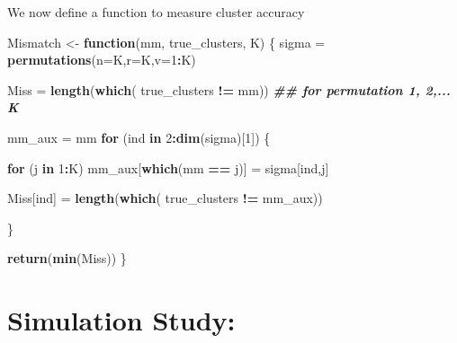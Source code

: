 \documentclass[
]{article}
\newenvironment{Shaded}{\begin{snugshade}}{\end{snugshade}}
\newcommand{\AttributeTok}[1]{\textcolor[rgb]{0.13,0.29,0.53}{#1}}
\newcommand{\ControlFlowTok}[1]{\textcolor[rgb]{0.13,0.29,0.53}{\textbf{#1}}}
\newcommand{\DecValTok}[1]{\textcolor[rgb]{0.00,0.00,0.81}{#1}}
\newcommand{\DocumentationTok}[1]{\textcolor[rgb]{0.56,0.35,0.01}{\textbf{\textit{#1}}}}
\newcommand{\FunctionTok}[1]{\textcolor[rgb]{0.13,0.29,0.53}{\textbf{#1}}}
\newcommand{\NormalTok}[1]{#1}
\newcommand{\OtherTok}[1]{\textcolor[rgb]{0.56,0.35,0.01}{#1}}
\newcommand{\SpecialCharTok}[1]{\textcolor[rgb]{0.81,0.36,0.00}{\textbf{#1}}}
\begin{document}
\begin{Shaded}
\end{Shaded}

We now define a function to measure cluster accuracy

\begin{Shaded}
\begin{Highlighting}[]
\NormalTok{Mismatch }\OtherTok{\textless{}{-}} \ControlFlowTok{function}\NormalTok{(mm, true\_clusters, K)}
\NormalTok{\{}
\NormalTok{  sigma }\OtherTok{=} \FunctionTok{permutations}\NormalTok{(}\AttributeTok{n=}\NormalTok{K,}\AttributeTok{r=}\NormalTok{K,}\AttributeTok{v=}\DecValTok{1}\SpecialCharTok{:}\NormalTok{K)}
  
\NormalTok{  Miss }\OtherTok{=} \FunctionTok{length}\NormalTok{(}\FunctionTok{which}\NormalTok{( true\_clusters }\SpecialCharTok{!=}\NormalTok{ mm))  }\DocumentationTok{\#\# for permutation 1, 2,... K}
  
\NormalTok{  mm\_aux }\OtherTok{=}\NormalTok{ mm}
  \ControlFlowTok{for}\NormalTok{ (ind }\ControlFlowTok{in} \DecValTok{2}\SpecialCharTok{:}\FunctionTok{dim}\NormalTok{(sigma)[}\DecValTok{1}\NormalTok{])}
\NormalTok{  \{}
    
    \ControlFlowTok{for}\NormalTok{ (j }\ControlFlowTok{in} \DecValTok{1}\SpecialCharTok{:}\NormalTok{K)}
\NormalTok{      mm\_aux[}\FunctionTok{which}\NormalTok{(mm }\SpecialCharTok{==}\NormalTok{ j)] }\OtherTok{=}\NormalTok{ sigma[ind,j]}
    
\NormalTok{    Miss[ind] }\OtherTok{=}  \FunctionTok{length}\NormalTok{(}\FunctionTok{which}\NormalTok{( true\_clusters }\SpecialCharTok{!=}\NormalTok{ mm\_aux))}
    
\NormalTok{  \}}
  
  
  \FunctionTok{return}\NormalTok{(}\FunctionTok{min}\NormalTok{(Miss))}
\NormalTok{\}}
\end{Highlighting}
\end{Shaded}

\section{Simulation Study:}\label{simulation-study}
\end{document}

